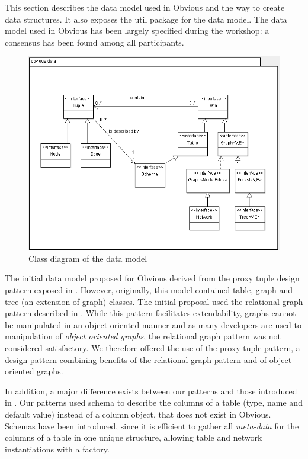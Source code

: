 This section describes the data model used in Obvious and the way to
create data structures. It also exposes the util package for the data
model.  The data model used in Obvious has been largely specified
during the workshop: a consensus has been found among all
participants.

\begin{figure}[!h]
\includegraphics[width=\columnwidth]{figures/obviousdataclass}
\caption{Class diagram of the data model}
\label{fig:datamodel}
\end{figure}

The initial data model proposed for Obvious derived from the proxy tuple
design pattern exposed in \cite{DesignPatternsIV}. However, originally, this model
contained table, graph and tree (an extension of graph) classes. The initial proposal
used the relational graph pattern described in \cite{DesignPatternsIV}. 
While this pattern facilitates extendability, graphs cannot be manipulated in an
object-oriented manner and as many developers are used to manipulation of
 \emph{object oriented graphs}, the relational graph pattern was not considered
 satisfactory.  We therefore offered the use of the proxy tuple pattern, a
design pattern combining benefits of the relational graph pattern and
of object oriented graphs.

In addition, a major difference exists between our patterns and those
introduced in \cite{DesignPatternsIV}. Our patterns used schema to describe
the columns of a table (type, name and default value) instead of a column object,
that does not exist in Obvious. Schemas have been introduced, since it
is efficient to gather all \emph{meta-data} for the columns of a
table in one unique structure, allowing table and network instantiations
with a factory.

